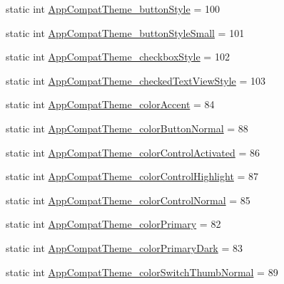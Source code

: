 \begin{DoxyCompactItemize}
\item 
static int \hyperlink{classandroid_1_1support_1_1v7_1_1appcompat_1_1R_1_1styleable_a04456db225a82b7745bd0f1915afe311}{App\+Compat\+Theme\+\_\+button\+Style} = 100
\item 
static int \hyperlink{classandroid_1_1support_1_1v7_1_1appcompat_1_1R_1_1styleable_a1cb9b470321310da072244cad16cbda3}{App\+Compat\+Theme\+\_\+button\+Style\+Small} = 101
\item 
static int \hyperlink{classandroid_1_1support_1_1v7_1_1appcompat_1_1R_1_1styleable_af7ac616091affeb34fec71e5ee8b5c65}{App\+Compat\+Theme\+\_\+checkbox\+Style} = 102
\item 
static int \hyperlink{classandroid_1_1support_1_1v7_1_1appcompat_1_1R_1_1styleable_aa6468311a9d0b5f772dae98fbcf245cd}{App\+Compat\+Theme\+\_\+checked\+Text\+View\+Style} = 103
\item 
static int \hyperlink{classandroid_1_1support_1_1v7_1_1appcompat_1_1R_1_1styleable_aff4d2589b88c34cd389125973debcd18}{App\+Compat\+Theme\+\_\+color\+Accent} = 84
\item 
static int \hyperlink{classandroid_1_1support_1_1v7_1_1appcompat_1_1R_1_1styleable_a8b1a254d15e9a8ad527d4515f5395b3c}{App\+Compat\+Theme\+\_\+color\+Button\+Normal} = 88
\item 
static int \hyperlink{classandroid_1_1support_1_1v7_1_1appcompat_1_1R_1_1styleable_a9111aa1922570418c642eb40adbae88e}{App\+Compat\+Theme\+\_\+color\+Control\+Activated} = 86
\item 
static int \hyperlink{classandroid_1_1support_1_1v7_1_1appcompat_1_1R_1_1styleable_a504c897bce159e8458dad5fa7717be03}{App\+Compat\+Theme\+\_\+color\+Control\+Highlight} = 87
\item 
static int \hyperlink{classandroid_1_1support_1_1v7_1_1appcompat_1_1R_1_1styleable_a3a60170ac3e2b1e037970b2ba1eea507}{App\+Compat\+Theme\+\_\+color\+Control\+Normal} = 85
\item 
static int \hyperlink{classandroid_1_1support_1_1v7_1_1appcompat_1_1R_1_1styleable_a26d76193ccbedca9d0812bd6a9da153c}{App\+Compat\+Theme\+\_\+color\+Primary} = 82
\item 
static int \hyperlink{classandroid_1_1support_1_1v7_1_1appcompat_1_1R_1_1styleable_af91ab112f2b33d3628adc9f30b24ba98}{App\+Compat\+Theme\+\_\+color\+Primary\+Dark} = 83
\item 
static int \hyperlink{classandroid_1_1support_1_1v7_1_1appcompat_1_1R_1_1styleable_a879b8157b7dcefca9179aa3158069301}{App\+Compat\+Theme\+\_\+color\+Switch\+Thumb\+Normal} = 89
\item 

\end{DoxyCompactItemize}
